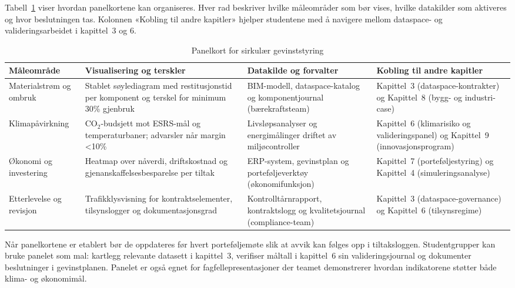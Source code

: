 Tabell~\ref{tab:sirkular-panel} viser hvordan panelkortene kan organiseres. Hver rad beskriver hvilke måleområder som bør vises, hvilke datakilder som aktiveres og hvor beslutningen tas. Kolonnen «Kobling til andre kapitler» hjelper studentene med å navigere mellom dataspace- og valideringsarbeidet i kapittel~3 og 6.

\begin{table}[h]
    \centering
    \caption{Panelkort for sirkulær gevinststyring}
    \label{tab:sirkular-panel}
    \begin{tabular}{p{3.1cm}p{3.8cm}p{3.6cm}p{3.4cm}}
        \toprule
        Måleområde & Visualisering og terskler & Datakilde og forvalter & Kobling til andre kapitler \\
        \midrule
        Materialstrøm og ombruk & Stablet søylediagram med restitusjonstid per komponent og terskel for minimum 30\% gjenbruk & BIM-modell, dataspace-katalog og komponentjournal (bærekraftsteam) & Kapittel~3 (dataspace-kontrakter) og Kapittel~8 (bygg- og industri-case) \\
        \addlinespace
        Klimapåvirkning & CO$_2$-budsjett mot ESRS-mål og temperaturbaner; advarsler når margin <10\% & Livsløpsanalyser og energimålinger driftet av miljøcontroller & Kapittel~6 (klimarisiko og valideringspanel) og Kapittel~9 (innovasjonsprogram) \\
        \addlinespace
        Økonomi og investering & Heatmap over nåverdi, driftskostnad og gjenanskaffelsesbesparelse per tiltak & ERP-system, gevinstplan og porteføljeverktøy (økonomifunksjon) & Kapittel~7 (porteføljestyring) og Kapittel~4 (simuleringsanalyse) \\
        \addlinespace
        Etterlevelse og revisjon & Trafikklysvisning for kontraktselementer, tilsynslogger og dokumentasjonsgrad & Kontrolltårnrapport, kontraktslogg og kvalitetsjournal (compliance-team) & Kapittel~3 (dataspace-governance) og Kapittel~6 (tilsynsregime) \\
        \bottomrule
    \end{tabular}
\end{table}

Når panelkortene er etablert bør de oppdateres før hvert porteføljemøte slik at avvik kan følges opp i tiltaksloggen. Studentgrupper kan bruke panelet som mal: kartlegg relevante datasett i kapittel~3, verifiser måltall i kapittel~6 sin valideringsjournal og dokumenter beslutninger i gevinstplanen. Panelet er også egnet for fagfellepresentasjoner der teamet demonstrerer hvordan indikatorene støtter både klima- og økonomimål.

